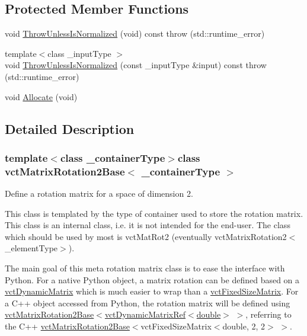 \subsection*{Protected Member Functions}
\begin{DoxyCompactItemize}
\item 
void \hyperlink{classvct_matrix_rotation2_base_a4545e2e435212f5e180b06b28d4f9f28}{Throw\+Unless\+Is\+Normalized} (void) const   throw (std\+::runtime\+\_\+error)
\item 
{\footnotesize template$<$class \+\_\+input\+Type $>$ }\\void \hyperlink{classvct_matrix_rotation2_base_a3677991b6dc883d5396ca22766eb8c2b}{Throw\+Unless\+Is\+Normalized} (const \+\_\+input\+Type \&input) const   throw (std\+::runtime\+\_\+error)
\item 
void \hyperlink{classvct_matrix_rotation2_base_afa9b55061c3932d739117db85d0270be}{Allocate} (void)
\end{DoxyCompactItemize}


\subsection{Detailed Description}
\subsubsection*{template$<$class \+\_\+container\+Type$>$class vct\+Matrix\+Rotation2\+Base$<$ \+\_\+container\+Type $>$}

Define a rotation matrix for a space of dimension 2. 

This class is templated by the type of container used to store the rotation matrix. This class is an internal class, i.\+e. it is not intended for the end-\/user. The class which should be used by most is vct\+Mat\+Rot2 (eventually vct\+Matrix\+Rotation2$<$\+\_\+element\+Type$>$).

The main goal of this meta rotation matrix class is to ease the interface with Python. For a native Python object, a matrix rotation can be defined based on a \hyperlink{classvct_dynamic_matrix}{vct\+Dynamic\+Matrix} which is much easier to wrap than a \hyperlink{classvct_fixed_size_matrix}{vct\+Fixed\+Size\+Matrix}. For a C++ object accessed from Python, the rotation matrix will be defined using \hyperlink{classvct_matrix_rotation2_base}{vct\+Matrix\+Rotation2\+Base}$<$\hyperlink{classvct_dynamic_matrix_ref}{vct\+Dynamic\+Matrix\+Ref$<$double$>$} $>$, referring to the C++ \hyperlink{classvct_matrix_rotation2_base}{vct\+Matrix\+Rotation2\+Base}$<$vct\+Fixed\+Size\+Matrix$<$double, 2, 2$>$ $>$.


